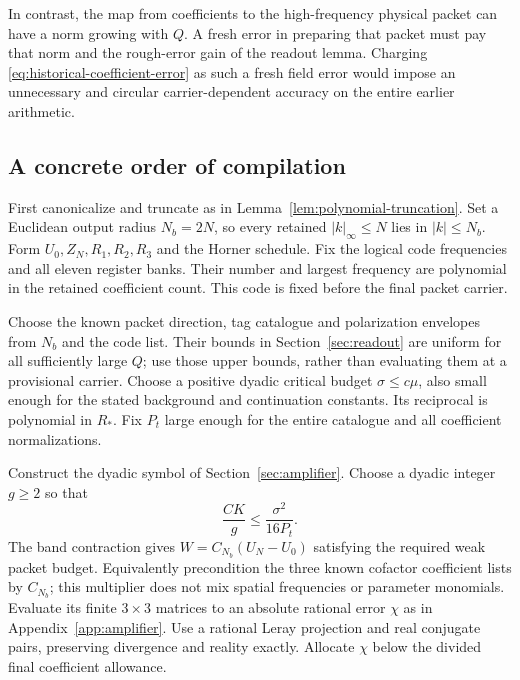 \documentclass[11pt,a4paper]{amsart}
\theoremstyle{definition}
\theoremstyle{remark}
\numberwithin{equation}{section}
\begin{document}
In contrast, the map from coefficients to the high-frequency physical
packet can have a norm growing with $Q$. A fresh error in preparing that
packet must pay that norm and the rough-error gain of the readout lemma.
Charging \eqref{eq:historical-coefficient-error} as such a fresh field error
would impose an unnecessary and circular carrier-dependent accuracy on the
entire earlier arithmetic.

\subsection{A concrete order of compilation}
First canonicalize and truncate as in
Lemma~\ref{lem:polynomial-truncation}. Set a Euclidean output radius
$N_b=2N$, so every retained $|k|_\infty\le N$ lies in $|k|\le N_b$.
Form $U_0,Z_N,R_1,R_2,R_3$ and the Horner schedule. Fix the logical code
frequencies and all eleven register banks. Their number and largest
frequency are polynomial in the retained coefficient count. This code is
fixed before the final packet carrier.

Choose the known packet direction, tag catalogue and polarization envelopes
from $N_b$ and the code list. Their bounds in Section~\ref{sec:readout} are
uniform for all sufficiently large $Q$; use those upper bounds, rather than
evaluating them at a provisional carrier. Choose a positive dyadic critical
budget $\sigma\le c\mu$, also small enough for the stated background and
continuation constants. Its reciprocal is polynomial in $R_*$. Fix $P_t$
large enough for the entire catalogue and all coefficient normalizations.

Construct the dyadic symbol of Section~\ref{sec:amplifier}. Choose a dyadic
integer $g\ge2$ so that
\begin{equation}\label{eq:gain-choice}
 \frac{CK}{g}\le\frac{\sigma^2}{16P_t}.
\end{equation}
The band contraction gives $W=C_{N_b}(U_N-U_0)$ satisfying the required weak
packet budget. Equivalently precondition the three known cofactor coefficient
lists by $C_{N_b}$; this multiplier does not mix spatial frequencies or
parameter monomials. Evaluate its finite $3\times3$ matrices to an absolute
rational error $\chi$ as in Appendix~\ref{app:amplifier}. Use a rational
Leray projection and real conjugate pairs, preserving divergence and reality
exactly. Allocate $\chi$ below the divided final coefficient allowance.
\end{document}
